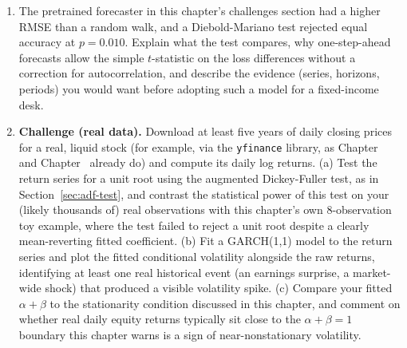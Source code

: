 \documentclass[../ai_in_finance]{subfiles}
\begin{document}
\begin{enumerate}[exercises]
    \item The pretrained forecaster in this chapter's challenges section had a higher RMSE than a random walk, and a Diebold-Mariano test rejected equal accuracy at $p = 0.010$. Explain what the test compares, why one-step-ahead forecasts allow the simple $t$-statistic on the loss differences without a correction for autocorrelation, and describe the evidence (series, horizons, periods) you would want before adopting such a model for a fixed-income desk.
    \item \textbf{Challenge (real data).} Download at least five years of daily closing prices for a real, liquid stock (for example, via the \texttt{yfinance} library, as Chapter~ and Chapter~ already do) and compute its daily log returns. (a) Test the return series for a unit root using the augmented Dickey-Fuller test, as in Section~\ref{sec:adf-test}, and contrast the statistical power of this test on your (likely thousands of) real observations with this chapter's own 8-observation toy example, where the test failed to reject a unit root despite a clearly mean-reverting fitted coefficient. (b) Fit a GARCH(1,1) model to the return series and plot the fitted conditional volatility alongside the raw returns, identifying at least one real historical event (an earnings surprise, a market-wide shock) that produced a visible volatility spike. (c) Compare your fitted $\alpha+\beta$ to the stationarity condition discussed in this chapter, and comment on whether real daily equity returns typically sit close to the $\alpha+\beta=1$ boundary this chapter warns is a sign of near-nonstationary volatility.
\end{enumerate}

\end{document}

